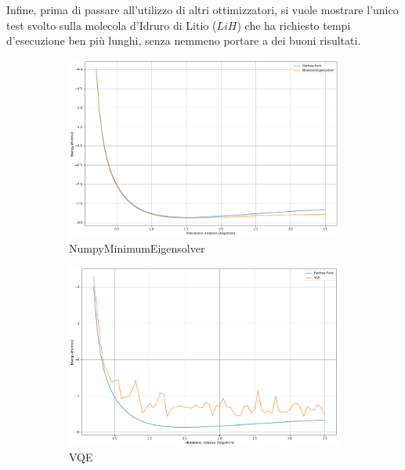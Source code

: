 Infine, prima di passare all'utilizzo di altri ottimizzatori, si vuole mostrare l'unico test svolto sulla molecola d'Idruro di Litio ($LiH$) che ha richiesto tempi d'esecuzione ben più lunghi, senza nemmeno portare a dei buoni risultati.
\begin{figure}[h]
    \begin{subfigure}[h]{0.49\linewidth}
        \includegraphics[width=\linewidth]{Images/Capitolo3/Plots/LiH_numpy_minimum_eigensolver_plot.png}
        \caption{NumpyMinimumEigensolver}
    \end{subfigure}
    \hfill
    \begin{subfigure}[h]{0.49\linewidth}
        \includegraphics[width=\linewidth]{Images/Capitolo3/Plots/LiH_twolocal_ry_rz_cz_gpu_plot.png}
        \caption{VQE}
    \end{subfigure}%
    \caption[Grafico 7 \newline LiH - TwoLocal - L\_BFGS\_B - Notebook\_GPU - Aer.]{}
    \label{fig:notebookgpu_LiH_aer}
\end{figure}

